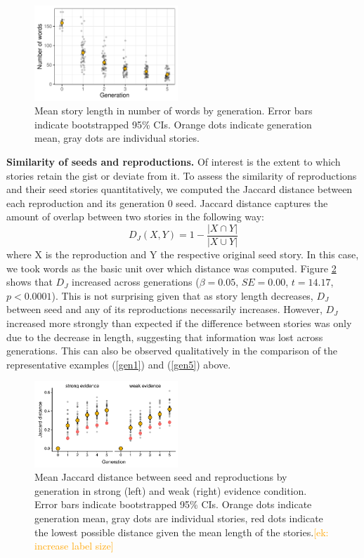 \documentclass[10pt,letterpaper]{article}
\newcommand{\ek}[1]{\textcolor{Orange}{[ek: #1]}}
\begin{document}
\begin{figure}[]
	\includegraphics[width=0.48\textwidth]{graphs/corpus_length.pdf}
	\caption{Mean story length in number of words by generation. Error bars indicate bootstrapped 95\% CIs. Orange dots indicate generation mean, gray dots are individual stories.} 
	\label{fig:storylength}
\end{figure}

\textbf{Similarity of seeds and reproductions.} Of interest is the extent to which stories retain the gist or deviate from it. To assess the similarity of reproductions and their seed stories quantitatively, we computed the Jaccard distance between each reproduction and its generation 0 seed. Jaccard distance captures the amount of overlap between two stories in the following way: \[D_J(X,Y) = 1 - \frac{|X \cap Y|}{|X \cup Y|}\] where X is the reproduction and Y the respective original seed story. In this case, we took words as the basic unit over which distance was computed. Figure \ref{fig:jaccdistance} shows that $D_J$ increased across generations ($\beta = 0.05$, $SE = 0.00$, $t = 14.17$, $p < 0.0001$). This is not surprising given that as story length decreases, $D_J$ between seed and any of its reproductions necessarily increases. However, $D_J$ increased more strongly than expected if the difference between stories was only due to the decrease in length, suggesting that information was lost across generations. This can also be observed qualitatively in the comparison of the representative examples (\ref{gen1}) and (\ref{gen5}) above.

\begin{figure}[]
	\includegraphics[width=0.48\textwidth]{graphs/jaccdistance.pdf}
	\caption{Mean Jaccard distance between seed and reproductions by generation in strong (left) and weak (right) evidence condition. Error bars indicate bootstrapped 95\% CIs. Orange dots indicate generation mean, gray dots are individual stories, red dots indicate the lowest possible distance given the mean length of the stories.\ek{increase label size}} 
	\label{fig:jaccdistance}
\end{figure}
\end{document}
